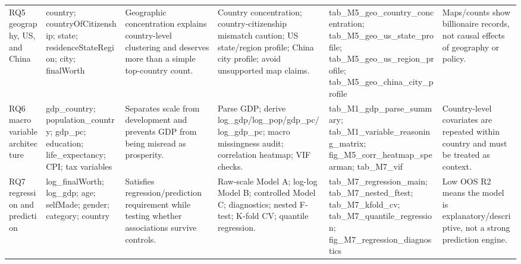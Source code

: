 \begin{tabular}{llllll}
RQ5 geography, US, and China & country; countryOfCitizenship; state; residenceStateRegion; city; finalWorth & Geographic concentration explains country-level clustering and deserves more than a simple top-country count. & Country concentration; country-citizenship mismatch caution; US state/region profile; China city profile; avoid unsupported map claims. & tab\_M5\_geo\_country\_concentration; tab\_M5\_geo\_us\_state\_profile; tab\_M5\_geo\_us\_region\_profile; tab\_M5\_geo\_china\_city\_profile & Maps/counts show billionaire records, not causal effects of geography or policy. \\
RQ6 macro variable architecture & gdp\_country; population\_country; gdp\_pc; education; life\_expectancy; CPI; tax variables & Separates scale from development and prevents GDP from being misread as prosperity. & Parse GDP; derive log\_gdp/log\_pop/gdp\_pc/log\_gdp\_pc; macro missingness audit; correlation heatmap; VIF checks. & tab\_M1\_gdp\_parse\_summary; tab\_M1\_variable\_reasoning\_matrix; fig\_M5\_corr\_heatmap\_spearman; tab\_M7\_vif & Country-level covariates are repeated within country and must be treated as context. \\
RQ7 regression and prediction & log\_finalWorth; log\_gdp; age; selfMade; gender; category; country & Satisfies regression/prediction requirement while testing whether associations survive controls. & Raw-scale Model A; log-log Model B; controlled Model C; diagnostics; nested F-test; K-fold CV; quantile regression. & tab\_M7\_regression\_main; tab\_M7\_nested\_ftest; tab\_M7\_kfold\_cv; tab\_M7\_quantile\_regression; fig\_M7\_regression\_diagnostics & Low OOS R2 means the model is explanatory/descriptive, not a strong prediction engine. \\
\bottomrule
\end{tabular}
